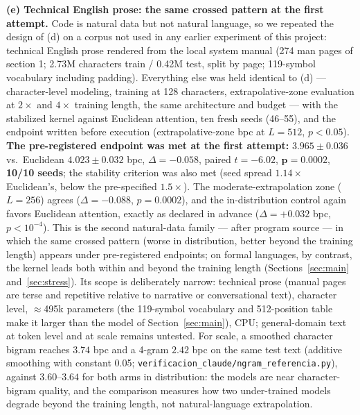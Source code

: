 \documentclass[11pt]{article}
\begin{document}
\textbf{(e) Technical English prose: the same crossed pattern at the first attempt.} Code is natural data but not natural language, so we repeated the design of (d) on a corpus not used in any earlier experiment of this project: technical English prose rendered from the local system manual (274 man pages of section 1; 2.73M characters train / 0.42M test, split by page; 119-symbol vocabulary including padding). Everything else was held identical to (d) --- character-level modeling, training at 128 characters, extrapolative-zone evaluation at $2\times$ and $4\times$ training length, the same architecture and budget --- with the stabilized kernel against Euclidean attention, ten fresh seeds (46--55), and the endpoint written before execution (extrapolative-zone bpc at $L{=}512$, $p<0.05$). \textbf{The pre-registered endpoint was met at the first attempt:} $3.965 \pm 0.036$ vs.\ Euclidean $4.023 \pm 0.032$ bpc, $\Delta = -0.058$, paired $t = -6.02$, $\bm{p = 0.0002}$, \textbf{10/10 seeds}; the stability criterion was also met (seed spread $1.14\times$ Euclidean's, below the pre-specified $1.5\times$). The moderate-extrapolation zone ($L{=}256$) agrees ($\Delta = -0.088$, $p = 0.0002$), and the in-distribution control again favors Euclidean attention, exactly as declared in advance ($\Delta = +0.032$ bpc, $p < 10^{-4}$). This is the second natural-data family --- after program source --- in which the same crossed pattern (worse in distribution, better beyond the training length) appears under pre-registered endpoints; on formal languages, by contrast, the kernel leads both within and beyond the training length (Sections~\ref{sec:main} and~\ref{sec:stress}). Its scope is deliberately narrow: technical prose (manual pages are terse and repetitive relative to narrative or conversational text), character level, $\approx$495k parameters (the 119-symbol vocabulary and 512-position table make it larger than the model of Section~\ref{sec:main}), CPU; general-domain text at token level and at scale remains untested. For scale, a smoothed character bigram reaches $3.74$ bpc and a 4-gram $2.42$ bpc on the same test text (additive smoothing with constant 0.05; \texttt{verificacion\_claude/}\allowbreak\texttt{ngram\_referencia.py}), against $3.60$--$3.64$ for both arms in distribution: the models are near character-bigram quality, and the comparison measures how two under-trained models degrade beyond the training length, not natural-language extrapolation.
\end{document}
